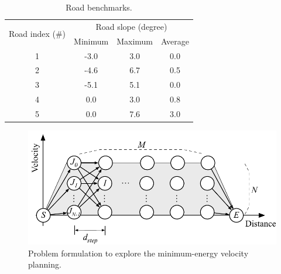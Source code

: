 \documentclass{IEEEtran}
\begin{document}
\begin{table} 
\caption{Road benchmarks.}
\centering
\label{table:road_bench}
\begin{tabular}{|c|c|c|c|}  \hline
\multirow{2}{*}{Road index (\#)}
			&\multicolumn{3}{|c|}{Road slope (degree)}  \\ \cline{2-4}
			&Minimum 	&Maximum 	&Average \\ \hline
1			&-3.0 		&3.0 			&0.0 	  	\\ \hline
2			&-4.6 		&6.7 			&0.5 		\\ \hline
3			&-5.1 		&5.1 			&0.0 		\\ \hline
4			&0.0 			&3.0 			&0.8		\\ \hline
5			&0.0 			&7.6 			&3.0 		\\ \hline

\end{tabular}
\end{table}

\begin{figure} [h]%
\includegraphics[width=1.0\hsize]{Figures/Opt_drive_problem.pdf}
\caption{Problem formulation to explore the minimum-energy velocity planning.}
\label{fig:Opt_drive_problem}
\end{figure}
\end{document}
